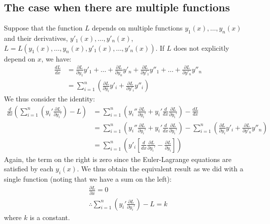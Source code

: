 \subsection{The case when there are multiple functions}
Suppose that the function $L$ depends on multiple functions $y_1(x),\dots, y_n(x)$ and their derivatives, $y'_1(x),\dots, y'_n(x)$, $L=L(y_1(x),\dots, y_n(x),y'_1(x),\dots, y'_n(x))$. If $L$ does not explicitly depend on $x$, we have:
\begin{align}
\frac{dL}{dx}&=\frac{\partial L}{\partial y_1}y'_1+\dots +\frac{\partial L}{\partial y_n}y'_n+
\frac{\partial L}{\partial y'_1}y''_1+\dots +\frac{\partial L}{\partial y'_n}y''_n\nonumber\\
&=\sum_{i=1}^n\left(\frac{\partial L}{\partial y_i}y'_i+\frac{\partial L}{\partial y'_i}y''_i \right)
\end{align}
We thus consider the identity:
\begin{align}
\frac{d}{dx}\left(\sum_{i=1}^n\left( y_i'\frac{\partial L}{\partial y_i'}\right) -L \right)&=\sum_{i=1}^n\left( y_i''\frac{\partial L}{\partial y_i'}+y_i'\frac{d}{dx}\frac{\partial L}{\partial y_i'}\right)-\frac{dL}{dx}\nonumber\\
&=\sum_{i=1}^n\left( y_i''\frac{\partial L}{\partial y_i'}+y_i'\frac{d}{dx}\frac{\partial L}{\partial y_i'}\right)-\sum_{i=1}^n\left(\frac{\partial L}{\partial y_i}y'_i+\frac{\partial L}{\partial y'_n}y''_n \right)\nonumber\\
&=\sum_{i=1}^n\left(y'_i\left[\frac{d}{dx}\frac{\partial L}{\partial y_i'}- \frac{\partial L}{\partial y_i} \right]  \right)
\end{align}
Again, the term on the right is zero since the Euler-Lagrange equations are satisfied by each $y_i(x)$. We thus obtain the equivalent result as we did with a single function (noting that we have a sum on the left):
\begin{align}
\frac{\partial L}{\partial x}=0\nonumber\\
\therefore \sum_{i=1}^n\left( y_i'\frac{\partial L}{\partial y_i'}\right) -L=k
\label{eqn:varnoxm}
\end{align}
where $k$ is a constant.



